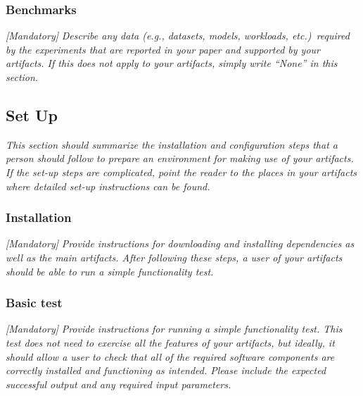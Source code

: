 \documentclass[nonacm,sigconf]{acmart}
\begin{document}

\subsubsection{Benchmarks}

\emph{[Mandatory]}
%
\emph{Describe any data (e.g., datasets, models, workloads,
etc.)\ required by the experiments that are reported in your paper and
supported by your artifacts.  If this does not apply to your
artifacts, simply write ``None'' in this section.}


\subsection{Set Up}

\emph{This section should summarize the installation and configuration
steps that a person should follow to prepare an environment for making
use of your artifacts.  If the set-up steps are complicated, point the
reader to the places in your artifacts where detailed set-up
instructions can be found.}


\subsubsection{Installation}

\emph{[Mandatory]}
%
\emph{Provide instructions for downloading and installing dependencies
as well as the main artifacts.  After following these steps, a user of
your artifacts should be able to run a simple functionality test.}


\subsubsection{Basic test}

\emph{[Mandatory]}
%
\emph{Provide instructions for running a simple functionality test.
This test does not need to exercise all the features of your
artifacts, but ideally, it should allow a user to check that all of
the required software components are correctly installed and
functioning as intended.  Please include the expected successful
output and any required input parameters.}

\end{document}
